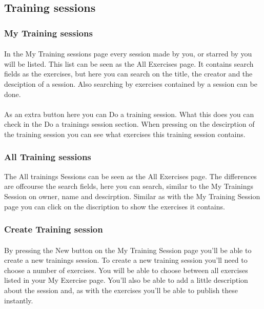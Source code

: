 \documentclass[11pt,a4paper]{scrartcl}
\begin{document}
\subsection{Training sessions}
\subsubsection{My Training sessions}
\paragraph{}In the My Training sessions page every session made by you, or starred by you will be listed. This list can be seen as the All Exercises page. It contains search fields as the exercises, but here you can search on the title, the creator and the desciption of a session. Also searching by exercises contained by a session can be done.
\paragraph{}As an extra button here you can Do a training session. What this does you can check in the Do a trainings session section. When pressing on the descirption of the training session you can see what exercises this training session contains.
\subsubsection{All Training sessions}
The All trainings Sessions can be seen as the All Exercises page. The differences are offcourse the search fields, here you can search, similar to the My Trainings Session on owner, name and descirption. Similar as with the My Training Session page you can click on the discription to show the exercises it contains.

\subsubsection{Create Training session}
\paragraph{}By pressing the New button on the My Training Session page you'll be able to create a new trainings session. To create a new training session you'll need to choose a number of exercises. You will be able to choose between all exercises listed in your My Exercise page. You'll also be able to add a little description about the session and, as with the exercises you'll be able to publish these instantly.
\end{document}
